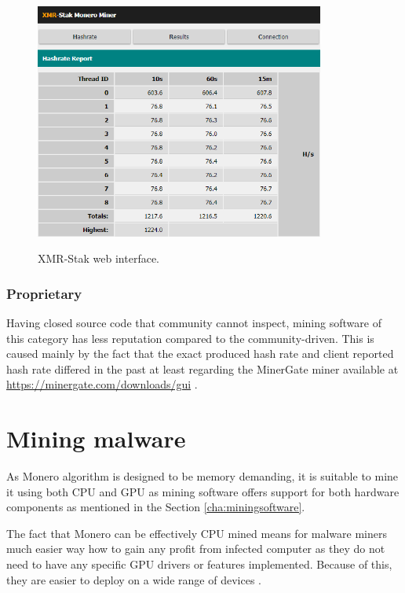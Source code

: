 \documentclass[
  printed, %
  table,   %
  lof,     %
  lot,     %
           oneside, color
]{fithesis3}
\begin{document}
\begin{figure}[H]
\begin{center}

    \vspace{-0.8em}
 \includegraphics[trim={0 0 0 0},clip,width=0.85\textwidth]{Screenshot_9.png}
    \caption{XMR-Stak web interface.}
    \vspace{-1.5em}
    \label{pic:withoutresdrawable}
\end{center}
    \end{figure}
    
\subsubsection{Proprietary}
Having closed source code that community cannot inspect, mining software of this category has less reputation compared to the community-driven. This is caused mainly by the fact that the exact produced hash rate and client reported hash rate differed in the past at least regarding the MinerGate miner available at \url{https://minergate.com/downloads/gui} .

\section{Mining malware }
\vspace{-0.2em}
As Monero algorithm is designed to be memory demanding, it is suitable to mine it using both CPU and GPU as mining software offers support for both hardware components as mentioned in the Section \ref{cha:miningsoftware}. 

The fact that Monero can be effectively CPU mined means for malware miners much easier way how to gain any profit from infected computer as they do not need to have any specific GPU drivers or features implemented. Because of this, they are easier to deploy on a wide range of devices \cite{le2018swimming}.
\vspace{-0.6em}
\end{document}
